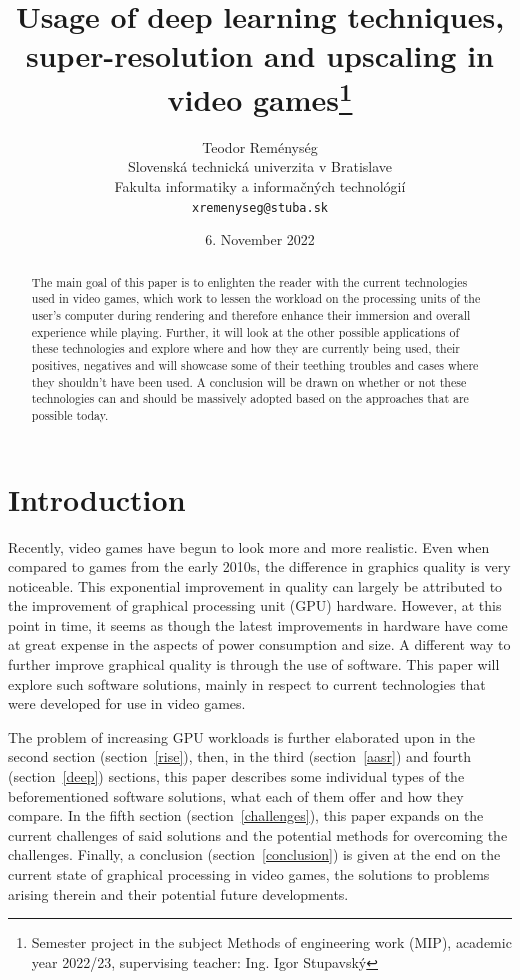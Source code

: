 \documentclass[10pt,oneside,english,a4paper]{article}
\title{Usage of deep learning techniques, super-resolution and upscaling in video games\thanks{Semester project in the subject Methods of engineering work (MIP), academic year 2022/23, supervising teacher: Ing. Igor Stupavský}}
\author{Teodor Reménység\\[2pt]
	{\small Slovenská technická univerzita v Bratislave}\\
	{\small Fakulta informatiky a informačných technológií}\\
	{\small \texttt{xremenyseg@stuba.sk}}
	}
\date{\small 6. November 2022}
\begin{document}
\maketitle

\begin{abstract}
The main goal of this paper is to enlighten the reader with the current technologies used in video games, which work to lessen the workload on the processing units of the user’s computer during rendering and therefore enhance their immersion and overall experience while playing. Further, it will look at the other possible applications of these technologies and explore where and how they are currently being used, their positives, negatives and will showcase some of their teething troubles and cases where they shouldn’t have been used. A conclusion will be drawn on whether or not these technologies can and should be massively adopted based on the approaches that are possible today.
\end{abstract}



\section{Introduction}

Recently, video games have begun to look more and more realistic. Even when compared to games from the early 2010s, the difference in graphics quality is very noticeable. This exponential improvement in quality can largely be attributed to the improvement of graphical processing unit (GPU) hardware. However, at this point in time, it seems as though the latest improvements in hardware have come at great expense in the aspects of power consumption and size. A different way to further improve graphical quality is through the use of software. This paper will explore such software solutions, mainly in respect to current technologies that were developed for use in video games.

The problem of increasing GPU workloads is further elaborated upon in the second section (section~\ref{rise}), then, in the third (section~\ref{aasr}) and fourth (section~\ref{deep}) sections, this paper describes some individual types of the beforementioned software solutions, what each of them offer and how they compare. In the fifth section (section~\ref{challenges}), this paper expands on the current challenges of said solutions and the potential methods for overcoming the challenges. Finally, a conclusion (section~\ref{conclusion}) is given at the end on the current state of graphical processing in video games, the solutions to problems arising therein and their potential future developments.
\end{document}
